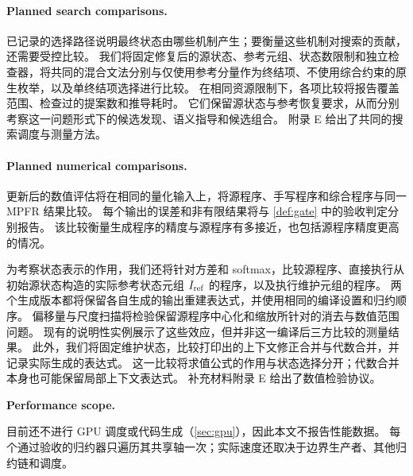 \paragraph{Planned search comparisons.}
已记录的选择路径说明最终状态由哪些机制产生；要衡量这些机制对搜索的贡献，还需要受控比较。
我们将固定修复后的源状态、参考元组、状态数限制和独立检查器，将共同的混合文法分别与仅使用参考分量作为终结项、不使用综合约束的原生枚举，以及单终结项选择进行比较。
在相同资源限制下，各项比较将报告覆盖范围、检查过的提案数和推导耗时。
它们保留源状态与参考恢复要求，从而分别考察这一问题形式下的候选发现、语义指导和候选组合。
附录 E 给出了共同的搜索调度与测量方法。

\paragraph{Planned numerical comparisons.}
\label{sec:eval-accuracy}

更新后的数值评估将在相同的量化输入上，将源程序、手写程序和综合程序与同一 MPFR 结果比较。
每个输出的误差和非有限结果将与 \cref{def:gate} 中的验收判定分别报告。
该比较衡量生成程序的精度与源程序有多接近，也包括源程序精度更高的情况。

为考察状态表示的作用，我们还将针对方差和 softmax，比较源程序、直接执行从初始源状态构造的实际参考状态元组 $I_{\mathrm{ref}}$ 的程序，以及执行维护元组的程序。
两个生成版本都将保留各自生成的输出重建表达式，并使用相同的编译设置和归约顺序。
偏移量与尺度扫描将检验保留源程序中心化和缩放所针对的消去与数值范围问题。
现有的说明性实例展示了这些效应，但并非这一编译后三方比较的测量结果。
此外，我们将固定维护状态，比较打印出的上下文修正合并与代数合并，并记录实际生成的表达式。
这一比较将求值公式的作用与状态选择分开；代数合并本身也可能保留局部上下文表达式。
补充材料附录 E 给出了数值检验协议。

\textbf{Performance scope.}\par
\label{sec:eval-perf}

\ifperf
{}
\else
\ifsubmit\else
{}
\fi
\sys 目前还不进行 GPU 调度或代码生成（\cref{sec:gpu}），因此本文不报告性能数据。
每个通过验收的归约器只遍历其共享轴一次；实际速度还取决于边界生产者、其他归约链和调度。
\fi
